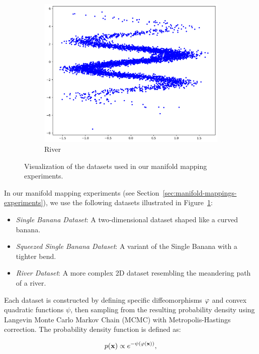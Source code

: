 \begin{figure}[ht]
\begin{subfigure}[b]{0.32\textwidth}
\includegraphics[width=\textwidth]{Chapter5/results/visualisations/datasets/river.png}
\caption{River}
\end{subfigure}
\caption{Visualization of the datasets used in our manifold mapping experiments.}
\label{fig:datasets}
\end{figure}

In our manifold mapping experiments (see Section~\ref{sec:manifold-mappings-experiments}), we use the following datasets illustrated in Figure~\ref{fig:datasets}:

\begin{itemize}
    \item \textit{Single Banana Dataset}: A two-dimensional dataset shaped like a curved banana.
    \item \textit{Squeezed Single Banana Dataset}: A variant of the Single Banana with a tighter bend.
    \item \textit{River Dataset}: A more complex 2D dataset resembling the meandering path of a river.
\end{itemize}

Each dataset is constructed by defining specific diffeomorphisms $\varphi$ and convex quadratic functions $\psi$, then sampling from the resulting probability density using Langevin Monte Carlo Markov Chain (MCMC) with Metropolis-Hastings correction. The probability density function is defined as:

\begin{equation}
    p(\mathbf{x}) \propto e^{-\psi(\varphi(\mathbf{x}))},
    \label{eq:stroco-diffeo-density-ap}
\end{equation}

